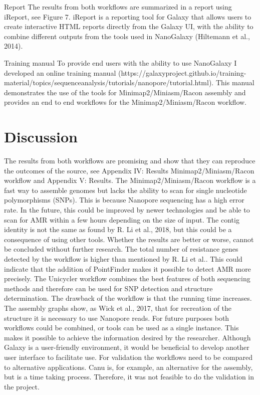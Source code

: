 \documentclass[a4paper,num-refs]{oup-contemporary}
\begin{document}
Report
The results from both workflows are summarized in a report using iReport, see Figure 7. iReport is a
reporting tool for Galaxy that allows users to create interactive HTML reports directly from the
Galaxy UI, with the ability to combine different outputs from the tools used in NanoGalaxy
(Hiltemann et al., 2014).

Training manual
To provide end users with the ability to use NanoGalaxy I developed an online training manual
(https://galaxyproject.github.io/training-material/topics/sequenceanalysis/tutorials/nanopore/tutorial.html). This manual demonstrates the use of the tools for
Minimap2/Miniasm/Racon assembly and provides an end to end workflows for the
Minimap2/Miniasm/Racon workflow.

\section{Discussion}
The results from both workflows are promising and show that they can reproduce the outcomes of the source, see Appendix IV: Results Minimap2/Miniasm/Racon workflow and Appendix V: Results. The Minimap2/Miniasm/Racon workflow is a fast way to assemble genomes but lacks the ability to
scan for single nucleotide polymorphisms (SNPs). This is because Nanopore sequencing has a high error rate. In the future, this could be improved by newer technologies and be able to scan for AMR within a few hours depending on the size of input. The contig identity is not the same as found by R.
Li et al., 2018, but this could be a consequence of using other tools. Whether the results are better or worse, cannot be concluded without further research. The total number of resistance genes detected by the workflow is higher than mentioned by R. Li et al.. This could indicate that the addition of PointFinder makes it possible to detect AMR more precisely. The Unicycler workflow combines the best features of both sequencing methods and therefore can be used for SNP detection and structure determination. The drawback of the workflow is that the running time
increases. The assembly graphs show, as Wick et al., 2017, that for recreation of the structure it is necessary to use Nanopore reads. For future purposes both workflows could be combined, or tools can be used as a single instance. This makes it possible to achieve the information desired by the researcher. Although Galaxy is a user-friendly environment, it would be beneficial to develop another user interface to facilitate use. For validation the workflows need to be compared to alternative applications. Canu is, for example, an alternative for the assembly, but is a time taking
process. Therefore, it was not feasible to do the validation in the project.
\end{document}
